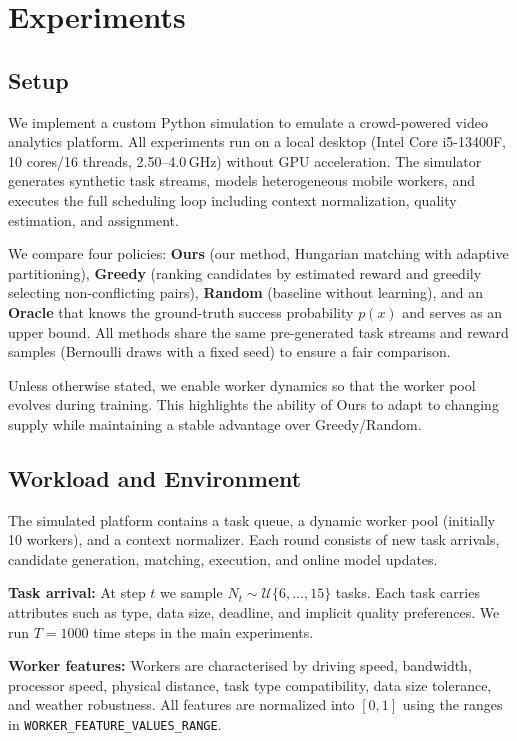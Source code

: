 ﻿\section{Experiments}
\label{sec:experiments}

\subsection{Setup}
We implement a custom Python simulation to emulate a crowd-powered video analytics platform. All experiments run on a local desktop (Intel Core i5-13400F, 10 cores/16 threads, 2.50--4.0\,GHz) without GPU acceleration. The simulator generates synthetic task streams, models heterogeneous mobile workers, and executes the full scheduling loop including context normalization, quality estimation, and assignment.

We compare four policies:
\textbf{Ours} (our method, Hungarian matching with adaptive partitioning),
\textbf{Greedy} (ranking candidates by estimated reward and greedily selecting non-conflicting pairs),
\textbf{Random} (baseline without learning), and an \textbf{Oracle} that knows the ground-truth success probability $p(x)$ and serves as an upper bound.
All methods share the same pre-generated task streams and reward samples (Bernoulli draws with a fixed seed) to ensure a fair comparison.

Unless otherwise stated, we enable worker dynamics so that the worker pool evolves during training. This highlights the ability of Ours to adapt to changing supply while maintaining a stable advantage over Greedy/Random.

\subsection{Workload and Environment}
The simulated platform contains a task queue, a dynamic worker pool (initially 10 workers), and a context normalizer. Each round consists of new task arrivals, candidate generation, matching, execution, and online model updates.

\textbf{Task arrival:} At step $t$ we sample $N_t \sim \mathcal{U}\{6, \ldots, 15\}$ tasks. Each task carries attributes such as type, data size, deadline, and implicit quality preferences. We run $T=1000$ time steps in the main experiments.

\textbf{Worker features:} Workers are characterised by driving speed, bandwidth, processor speed, physical distance, task type compatibility, data size tolerance, and weather robustness. All features are normalized into $[0,1]$ using the ranges in \texttt{WORKER\_FEATURE\_VALUES\_RANGE}.

